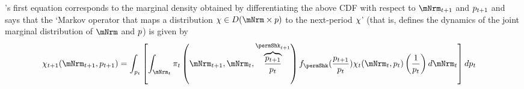 \documentclass[\econtexRoot/BufferStockTheory]{subfiles}
\begin{document}
\cite{harmenbergInvariant}'s first equation corresponds to the marginal density obtained by differentiating the above CDF with respect to $\mNrmNxt$ and $p_{t+1}$ and says that the `Markov operator that maps a distribution $\mpPrb \in D(\mNrm \times \permLvlPrb)$ to the next-period $\chi$' (that is, defines the dynamics of the joint marginal distribution of $\mNrm$ and $p$) is given by
\begin{align} \label{eq:MeasTrnst}
\mpPrb_{t+1}(\mNrmNxt,\permLvlPrbNxt) & =
                                          \int_{\permLvlPrbNow} \left[
                                           \int_{\mNrmNow} \lomdkPrb_{t}\left(\mNrmNxt,\mNrmNow,
                                           \overbrace{\frac{\permLvlPrbNxt}{\PermGroFac \permLvlPrbNow}}^{\permShkPrbNxt}\right)\permShkRawPrb(\frac{\permLvlPrbNxt}{\PermGroFac \permLvlPrbNow})\mpPrb_{t}(\mNrmNow,\permLvlPrbNow)\left(\frac{1}{\PermGroFac \permLvlPrbNow}\right)  d \mNrmNow
                                          \right] d \permLvlPrbNow
\end{align}
\newcommand{\nPermShk}{\texttt{i}}\newcommand{\nmNrmVecNow}{\texttt{j}}\newcommand{\nmNrmVecNxt}{\texttt{k}}\newcommand{\permLvlNow}{\texttt{n}}\newcommand{\npermLvlNxt}{\texttt{q}}
\newcommand{\npermLvlNow}{\digamma} %
\newcommand{\npermLvlVecNow}{\texttt{n}}\newcommand{\npermLvlVecNxt}{\texttt{q}}\newcommand{\nPermShkNxtFunc}{\iota(\npermLvlVecNow,\npermLvlVecNxt)}\newcommand{\nPermShkVecNxt}{\texttt{i}}
\newcommand{\mNrmVecNow}{\mNrmVec_{t}^{\nmNrmVecNow}}
\newcommand{\mNrmVecNxt}{\mNrmVec_{t+1}^{\nmNrmVecNxt}}
\newcommand{\permShkVecNxt}{\permShk_{t+1}^{\nPermShkVecNxt}}
\newcommand{\permShkVecNow}{\permShk_{t}^{\nPermShkVecNow}}
\renewcommand{\permLvlNow}{\permLvlPrb_{t}}
\newcommand{\permLvlNxt}{\permLvlPrb_{t+1}}
\newcommand{\permLvlVecNow}{\permLvlVec_{t}^{\npermLvlVecNow}}
\newcommand{\permLvlVecNxt}{\permLvlVec_{t+1}^{\npermLvlVecNxt}}
\end{document}
